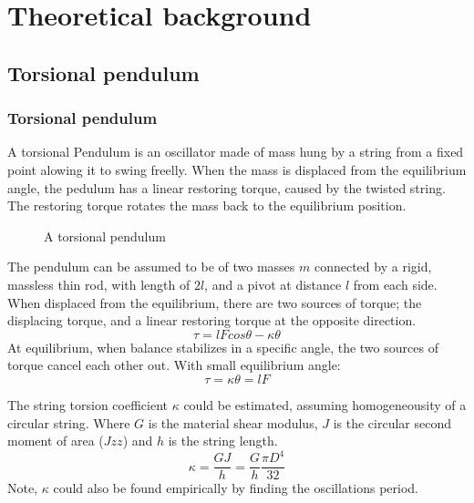 \documentclass[\main/master.tex]{subfiles}
\begin{document}
\chapter{Theoretical background}\label{chp:example-2}


\section{Torsional pendulum}
\subsection{Torsional pendulum}
A torsional Pendulum is an oscillator made of mass hung by a string from a fixed point alowing it to swing freelly. When the mass is displaced from the equilibrium angle, the pedulum has a linear restoring torque, caused by the twisted string. The restoring torque rotates the mass back to the equilibrium position.


\begin{figure}[htbp]
	\centering
	\caption[Torsional pendulum]{A torsional pendulum}
	\label{fig:torsion_pendulum}
\end{figure}

\par\noindent
The pendulum can be assumed to be of two masses $m$ connected by a rigid, massless thin rod, with length of $2l$, and a pivot at distance $l$ from each side. When displaced from the equilibrium, there are two sources of torque; the displacing torque, and a linear restoring torque at the opposite direction.
\begin{equation}
\tau = lFcos\theta -\kappa\theta    \label{eqn:Hooke_law}
\end{equation} 
At equilibrium, when balance stabilizes in a specific angle, the two sources of torque cancel each other out. 
With small equilibrium angle:
\begin{equation}
\tau = \kappa\theta = lF    \label{eqn:Hooke_law}
\end{equation}


\noindent
The string torsion coefficient $\kappa $ could be estimated, assuming homogeneousity of a circular string. Where $G$ is the material shear modulus, $J$ is the circular second moment of area ($Jzz$) and $h$ is the string length.
\begin{equation}
\kappa = \frac{GJ}{h} = \frac{G}{h} \frac{\pi D^4}{32}    \label{eqn:torsion_coefficient}
\end{equation}
Note, $\kappa$ could also be found empirically by finding  the  oscillations period.
 
\end{document}
